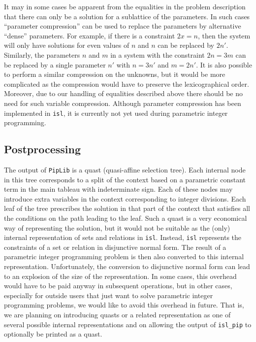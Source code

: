 It may in some cases be apparent from the equalities in the problem
description that there can only be a solution for a sublattice
of the parameters.  In such cases ``parameter compression''
\parencite{Meister2004PhD,Meister2008} can be used to replace
the parameters by alternative ``dense'' parameters.
For example, if there is a constraint $2x = n$, then the system
will only have solutions for even values of $n$ and $n$ can be replaced
by $2n'$.  Similarly, the parameters $n$ and $m$ in a system with
the constraint $2n = 3m$ can be replaced by a single parameter $n'$
with $n=3n'$ and $m=2n'$.
It is also possible to perform a similar compression on the unknowns,
but it would be more complicated as the compression would have to
preserve the lexicographical order.  Moreover, due to our handling
of equalities described above there should be
no need for such variable compression.
Although parameter compression has been implemented in {\tt isl},
it is currently not yet used during parametric integer programming.

\subsection{Postprocessing}\label{s:post}

The output of {\tt PipLib} is a quast (quasi-affine selection tree).
Each internal node in this tree corresponds to a split of the context
based on a parametric constant term in the main tableau with indeterminate
sign.  Each of these nodes may introduce extra variables in the context
corresponding to integer divisions.  Each leaf of the tree prescribes
the solution in that part of the context that satisfies all the conditions
on the path leading to the leaf.
Such a quast is a very economical way of representing the solution, but
it would not be suitable as the (only) internal representation of
sets and relations in {\tt isl}.  Instead, {\tt isl} represents
the constraints of a set or relation in disjunctive normal form.
The result of a parametric integer programming problem is then also
converted to this internal representation.  Unfortunately, the conversion
to disjunctive normal form can lead to an explosion of the size
of the representation.
In some cases, this overhead would have to be paid anyway in subsequent
operations, but in other cases, especially for outside users that just
want to solve parametric integer programming problems, we would like
to avoid this overhead in future.  That is, we are planning on introducing
quasts or a related representation as one of several possible internal
representations and on allowing the output of {\tt isl\_pip} to optionally
be printed as a quast.

